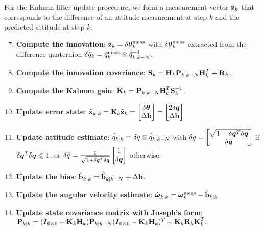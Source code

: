 For the Kalman filter update procedure, we form a measurement vector $\tilde{\textrm{\textbf{z}}}_{k}$ that corresponds to the difference of an attitude measurement at step $k$ and the predicted attitude at step $k$.

\begin{enumerate}
\setcounter{enumi}{6}
\item \textbf{Compute the innovation}: $\tilde{\textrm{\textbf{z}}}_{k} =  \delta\boldsymbol\theta^\textrm{meas}_{k}$ with $\delta\boldsymbol\theta^\textrm{meas}_{k}$ extracted from the difference quaternion $\delta\bar{q}_{k} = \bar{q}^{\textrm{meas}}_{k} \otimes \hat{\bar{q}}^{-1}_{k|k-N}$. 
\item \textbf{Compute the innovation covariance}: $\textrm{\textbf{S}}_{k} = \textrm{\textbf{H}}_{k}\textrm{\textbf{P}}_{k|k-N}\textrm{\textbf{H}}^T_{k} + \textrm{\textbf{R}}_{k}$.
\item \textbf{Compute the Kalman gain}: $\textrm{\textbf{K}}_{k} = \textrm{\textbf{P}}_{k|k-N}\textrm{\textbf{H}}^T_{k}\textrm{\textbf{S}}^{-1}_{k}$.
\item \textbf{Update error state}: $\tilde{\textrm{\textbf{x}}}_{k|k} = \textrm{\textbf{K}}_{k} \tilde{\textrm{\textbf{z}}}_{k} = \begin{bmatrix} \delta\boldsymbol\theta \\ \Delta\textrm{\textbf{b}}\end{bmatrix} = \begin{bmatrix} 2\delta\boldsymbol{q} \\ \Delta\textrm{\textbf{b}}\end{bmatrix}$
\item \textbf{Update attitude estimate}: $\hat{\bar{q}}_{k|k} =\delta\bar{q}\otimes \hat{\bar{q}}_{k|k-N}$ with $\delta\bar{q} = \begin{bmatrix} \sqrt{1-\delta\boldsymbol{q}^T\delta\boldsymbol{q}} \\ \delta\boldsymbol{q}\end{bmatrix}$ if $\delta\boldsymbol{q}^T\delta\boldsymbol{q} \leqslant 1$, or $\delta\bar{q} = \frac{1}{\sqrt{1+\delta\boldsymbol{q}^T\delta\boldsymbol{q}}}\begin{bmatrix} 1 \\ \delta\boldsymbol{q} \end{bmatrix}$ otherwise.
\item \textbf{Update the bias}: $\hat{\textrm{\textbf{b}}}_{k|k} = \hat{\textrm{\textbf{b}}}_{k|k-N} + \Delta\textrm{\textbf{b}}$.
\item \textbf{Update the angular velocity estimate}: $\hat{\boldsymbol\omega}_{k|k} = \boldsymbol\omega_k^{\textrm{meas}} - \hat{\textrm{\textbf{b}}}_{k|k}$
\item \textbf{Update state covariance matrix with Joseph's form}: $\textrm{\textbf{P}}_{k|k} = (\boldsymbol{I}_{6\times 6} - \textrm{\textbf{K}}_{k}\textrm{\textbf{H}}_{k})\textrm{\textbf{P}}_{k|k-N}(\boldsymbol{I}_{6\times 6} - \textrm{\textbf{K}}_{k}\textrm{\textbf{H}}_{k})^T + \textrm{\textbf{K}}_{k}\textrm{\textbf{R}}_{k}\textrm{\textbf{K}}_{k}^T.$
\end{enumerate}

